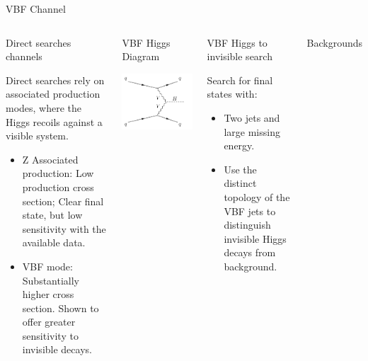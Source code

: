 \documentclass[8pt]{beamer}
\begin{document}
\begin{frame}{VBF Channel}

\begin{columns}
 
\begin{block}{Direct searches channels}

Direct searches rely on associated production modes, where the Higgs recoils against a visible system.
\begin{itemize}
 \item Z Associated production: Low production cross section; Clear final state, but low sensitivity with the available data.
 \item VBF mode: Substantially higher cross section. Shown to offer greater sensitivity to invisible decays.
\end{itemize}

\end{block}

\begin{block}{VBF Higgs Diagram}
 
\centering
\includegraphics[width=0.45\linewidth]{img/feyn_VBF.pdf} 

\end{block}

\begin{block}{VBF Higgs to invisible search}

Search for final states with:
\begin{itemize}
 \item Two jets and large missing energy.
 \item Use the distinct topology of the VBF jets to distinguish invisible Higgs decays from background.
\end{itemize}
 
\end{block}

\begin{block}{Backgrounds}


\end{block}
\end{columns}
\end{frame}
\end{document}
